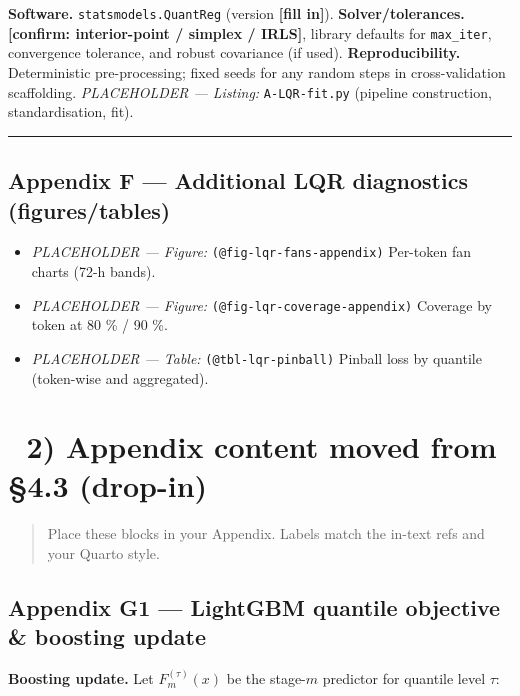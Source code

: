 \documentclass[
  a4paper,
  DIV=11,
  numbers=noendperiod]{scrreprt}
\providecommand{\tightlist}{%
  \setlength{\itemsep}{0pt}\setlength{\parskip}{0pt}}
\begin{document}
\textbf{Software.} \texttt{statsmodels.QuantReg} (version
\textbf{{[}fill in{]}}). \textbf{Solver/tolerances.} \textbf{{[}confirm:
interior-point / simplex / IRLS{]}}, library defaults for
\texttt{max\_iter}, convergence tolerance, and robust covariance (if
used). \textbf{Reproducibility.} Deterministic pre-processing; fixed
seeds for any random steps in cross-validation scaffolding.
\emph{PLACEHOLDER --- Listing:} \texttt{A-LQR-fit.py} (pipeline
construction, standardisation, fit).

\begin{center}\rule{0.5\linewidth}{0.5pt}\end{center}

\subsection{Appendix F --- Additional LQR diagnostics
(figures/tables)}\label{appendix-f-additional-lqr-diagnostics-figurestables}

\begin{itemize}
\tightlist
\item
  \emph{PLACEHOLDER --- Figure:} \texttt{(@fig-lqr-fans-appendix)}
  Per-token fan charts (72-h bands).
\item
  \emph{PLACEHOLDER --- Figure:} \texttt{(@fig-lqr-coverage-appendix)}
  Coverage by token at 80 \% / 90 \%.
\item
  \emph{PLACEHOLDER --- Table:} \texttt{(@tbl-lqr-pinball)} Pinball loss
  by quantile (token-wise and aggregated).
\end{itemize}

\section{📎 2) Appendix content moved from §4.3
(drop-in)}\label{appendix-content-moved-from-4.3-drop-in}

\begin{quote}
Place these blocks in your Appendix. Labels match the in-text refs and
your Quarto style.
\end{quote}

\subsection{Appendix G1 --- LightGBM quantile objective \& boosting
update}\label{app-g1-lgbm-obj}

\textbf{Boosting update.} Let \(F_m^{(\tau)}(x)\) be the stage-\(m\)
predictor for quantile level \(\tau\):
\end{document}
